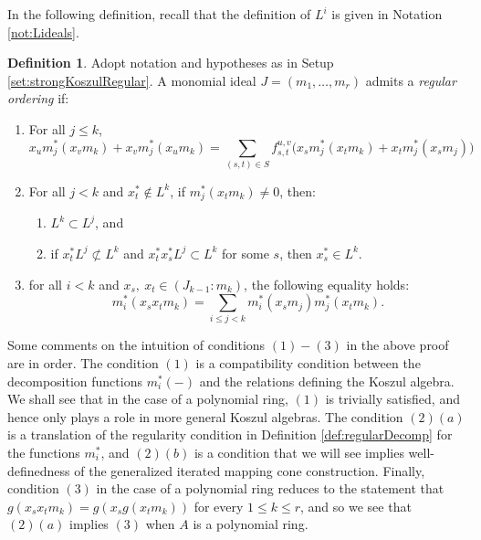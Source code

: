 \documentclass[10pt]{amsart}
\newtheorem{lemma}[theorem]{Lemma}
\theoremstyle{definition}
\newtheorem{definition}[theorem]{Definition}
\theoremstyle{remark}
\newtheorem{the context}[theorem]{The Context}
\numberwithin{equation}{theorem}
\numberwithin{equation}{section}
\renewcommand{\leq}{\leqslant}
\begin{document}
In the following definition, recall that the definition of $L^i$ is given in Notation \ref{not:Lideals}.


\begin{definition}\label{def:regulrityDef}
Adopt notation and hypotheses as in Setup \ref{set:strongKoszulRegular}. A monomial ideal $J = (m_1 , \dots , m_r)$ admits a \emph{regular ordering} if:
\begin{enumerate}
    \item For all $j \leq k$, 
    $$x_u m_j^* (x_v m_k) + x_v m_j^* (x_u m_k) = \sum_{(s,t) \in S} f_{s,t}^{u,v} \big( x_s m_j^* (x_t m_k) + x_t m_j^* (x_s m_j) \big)$$
    \item For all $j < k$ and $x_t^* \notin L^k$, if $m_j^* (x_t m_k ) \neq 0$, then: 
    \begin{enumerate}
        \item $L^k \subset L^j$, and
        \item if $x_t^* L^j \not\subset L^k$ and $x_t^* x_s^* L^j \subset L^k$ for some $s$, then $x_s^* \in L^k$.
    \end{enumerate}
    \item for all $i < k$ and $x_s, \ x_t \in (J_{k-1} : m_k)$, the following equality holds:
$$m_i^* (x_s x_t m_k ) =\sum_{i \leq j < k} m_i^* (x_s m_j ) m_j^* (x_t m_k ).$$
\end{enumerate}
\end{definition}

Some comments on the intuition of conditions $(1)-(3)$ in the above proof are in order. The condition $(1)$ is a compatibility condition between the decomposition functions $m_i^*(-)$ and the relations defining the Koszul algebra. We shall see that in the case of a polynomial ring, $(1)$ is trivially satisfied, and hence only plays a role in more general Koszul algebras. The condition $(2)(a)$ is a translation of the regularity condition in Definition \ref{def:regularDecomp} for the functions $m_i^*$, and $(2)(b)$ is a condition that we will see implies well-definedness of the generalized iterated mapping cone construction. Finally, condition $(3)$ in the case of a polynomial ring reduces to the statement that $g(x_s x_t m_k) = g(x_s g(x_t m_k))$ for every $1 \leq k \leq r$, and so we see that $(2)(a)$ implies $(3)$ when $A$ is a polynomial ring. 

\end{document}
